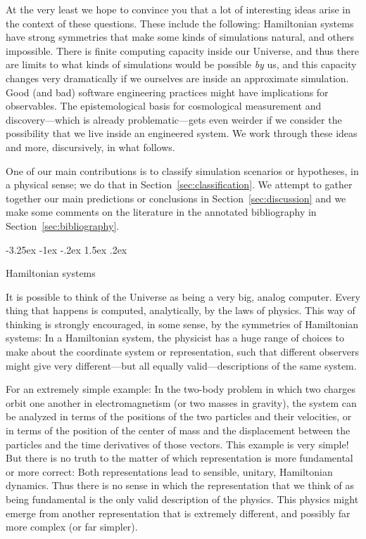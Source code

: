 \documentclass[letterpaper]{article}
\makeatletter
\renewcommand\section{\@startsection {section}{1}{\z@}%
  {-3.25ex \@plus -1ex \@minus -.2ex}%
  {1.5ex \@plus .2ex}%
  {\raggedright\normalfont\large\bfseries}}
\newcommand{\sectionname}{Section}
\newcommand{\secref}[1]{\sectionname~\ref{#1}}
\makeatother
\begin{document}
At the very least we hope to convince you that a lot of interesting ideas arise in the context of these questions.
These include the following:
Hamiltonian systems have strong symmetries that make some kinds of simulations natural, and others impossible.
There is finite computing capacity inside our Universe, and thus there are limits to what kinds of simulations would be possible \emph{by} us, and this capacity changes very dramatically if we ourselves are inside an approximate simulation.
Good (and bad) software engineering practices might have implications for observables.
The epistemological basis for cosmological measurement and discovery---which is already problematic---gets even weirder if we consider the possibility that we live inside an engineered system.
We work through these ideas and more, discursively, in what follows.

One of our main contributions is to classify simulation scenarios or hypotheses, in a physical sense; we do that in \secref{sec:classification}.
We attempt to gather together our main predictions or conclusions in \secref{sec:discussion} and we make some comments on the literature in the annotated bibliography in \secref{sec:bibliography}.

\section{Hamiltonian systems}\label{sec:hamiltonian}

It is possible to think of the Universe as being a very big, analog computer.
Every thing that happens is computed, analytically, by the laws of physics.
This way of thinking is strongly encouraged, in some sense, by the symmetries of Hamiltonian systems:
In a Hamiltonian system, the physicist has a huge range of choices to make about the coordinate system or representation, such that different observers might give very different---but all equally valid---descriptions of the same system.

For an extremely simple example: In the two-body problem in which two charges orbit one another in electromagnetism (or two masses in gravity), the system can be analyzed in terms of the positions of the two particles and their velocities, or in terms of the position of the center of mass and the displacement between the particles and the time derivatives of those vectors.
This example is very simple!
But there is no truth to the matter of which representation is more fundamental or more correct:
Both representations lead to sensible, unitary, Hamiltonian dynamics.
Thus there is no sense in which the representation that we think of as being fundamental is the only valid description of the physics.
This physics might emerge from another representation that is extremely different, and possibly far more complex (or far simpler).
\end{document}

